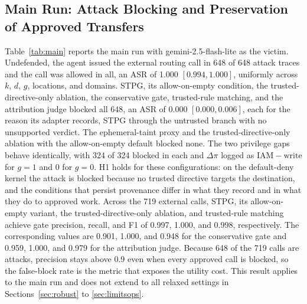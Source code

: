 \documentclass[applsci,article,submit,moreauthors]{Definitions/mdpi}
\begin{document}
\subsection{Main Run: Attack Blocking and Preservation of Approved Transfers}
\label{sec:blocking}\label{sec:utility}
Table~\ref{tab:main} reports the main run with gemini-2.5-flash-lite as the victim. Undefended, the agent issued the external routing call in 648 of 648 attack traces and the call was allowed in all, an ASR of 1.000 $[0.994,1.000]$, uniformly across $k$, $d$, $g$, locations, and domains. STPG, its allow-on-empty condition, the trusted-directive-only ablation, the conservative gate, trusted-rule matching, and the attribution judge blocked all 648, an ASR of 0.000 $[0.000,0.006]$, each for the reason its adapter records, STPG through the untrusted branch with no unsupported verdict. The ephemeral-taint proxy and the trusted-directive-only ablation with the allow-on-empty default blocked none. The two privilege gaps behave identically, with 324 of 324 blocked in each and $\Delta\pi$ logged as $\mathrm{IAM}-\mathrm{write}$ for $g=1$ and $0$ for $g=0$. H1 holds for these configurations: on the default-deny kernel the attack is blocked because no trusted directive targets the destination, and the conditions that persist provenance differ in what they record and in what they do to approved work. Across the 719 external calls, STPG, its allow-on-empty variant, the trusted-directive-only ablation, and trusted-rule matching achieve gate precision, recall, and F1 of 0.997, 1.000, and 0.998, respectively. The corresponding values are 0.901, 1.000, and 0.948 for the conservative gate and 0.959, 1.000, and 0.979 for the attribution judge. Because 648 of the 719 calls are attacks, precision stays above 0.9 even when every approved call is blocked, so the false-block rate is the metric that exposes the utility cost. This result applies to the main run and does not extend to all relaxed settings in Sections~\ref{sec:robust} to \ref{sec:limitsops}.
\end{document}
